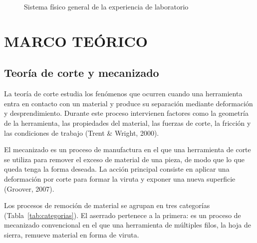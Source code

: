 \documentclass[12pt,a4paper]{article}
\begin{document}
\vspace{6pt}

\begin{figure}[H]
	\centering
	\caption{Sistema físico general de la experiencia de laboratorio}
\end{figure}

\section{MARCO TEÓRICO}

\subsection{Teoría de corte y mecanizado}

La teoría de corte estudia los fenómenos que ocurren cuando una
herramienta entra en contacto con un material y produce su separación mediante
deformación y desprendimiento. Durante este proceso intervienen factores como la
geometría de la herramienta, las propiedades del material, las fuerzas de corte,
la fricción y las condiciones de trabajo (Trent \& Wright, 2000).

\vspace{6pt}

El mecanizado es un proceso de manufactura en el que una herramienta de
corte se utiliza para remover el exceso de material de una pieza, de modo que
lo que queda tenga la forma deseada. La acción principal consiste en aplicar
una deformación por corte para formar la viruta y exponer una nueva
superficie (Groover, 2007).

\vspace{6pt}

Los procesos de remoción de material se agrupan en tres categorías
(Tabla~\ref{tab:categorias}). El aserrado pertenece a la primera: es un proceso
de mecanizado convencional en el que una herramienta de múltiples filos, la hoja
de sierra, remueve material en forma de viruta.

\vspace{6pt}
\end{document}
